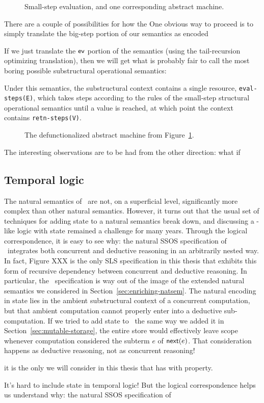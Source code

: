 \begin{figure}[tp]
\caption{Small-step evaluation, and one corresponding abstract machine.}
\label{fig:cbv-sos}
\end{figure}


There are a couple of possibilities for how the 
One obvious way to proceed is to simply translate the big-step portion
of our semantics as encoded 


If we just translate the ${\sf ev}$ portion of the semantics (using
the tail-recursion optimizing translation), then we will get what is
probably fair to call the most boring possible substructural
operational semantics: 

\smallskip
{}
\smallskip

\noindent
Under this semantics, the substructural context contains a single
resource, \Verb|eval-steps(E)|, which takes steps according to the
rules of the small-step structural operational semantics until a value
is reached, at which point the context contains \Verb|retn-steps(V)|.


\begin{figure}[t]
\caption{The defunctionalized abstract machine from Figure~\ref{fig:cbv-sos}.}
\label{fig:cbv-sos-defun}
\end{figure}

The interesting observations are to be had from the other direction: what if

\subsection{Temporal logic}

The natural semantics of \rowan~are not, on a superficial level,
significantly more complex than other natural semantics. However, it
turns out that the usual set of techniques for adding state to a
natural semantics break down, and discussing a \rowan-like logic with
state remained a challenge for many years. Through the
logical correspondence, it is easy to see why: the natural SSOS
specification of \rowan~integrates both concurrent and deductive
reasoning in an arbitrarily nested way. In fact, Figure XXX is the
only SLS specification in this thesis that exhibits this form of
recursive dependency between concurrent and deductive reasoning.  In
particular, the \rowan~specification is way out of the image of the
extended natural semantics we considered in
Section~\ref{sec:enriching-natsem}. The natural encoding in state lies
in the ambient substructural context of a concurrent computation, but
that ambient computation cannot properly enter into a deductive
sub-computation. If we tried to add state to \rowan~the same way we
added it in Section~\ref{sec:mutable-storage}, the entire store
would effectively leave scope whenever computation considered
the subterm $e$ of ${\sf next}(e)$. That consideration happens
as deductive reasoning, not as concurrent reasoning!

 it is the only we
will consider in this thesis that has with property.

It's hard to include state in temporal logic! But the logical correspondence
helps us understand why: the natural SSOS specification of 

